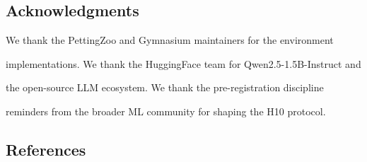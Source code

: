 \documentclass[11pt]{article}
\begin{document}
\subsection{Acknowledgments}\label{acknowledgments}

We thank the PettingZoo and Gymnasium maintainers for the environment

implementations. We thank the HuggingFace team for Qwen2.5-1.5B-Instruct
and

the open-source LLM ecosystem. We thank the pre-registration discipline

reminders from the broader ML community for shaping the H10 protocol.

\subsection{References}\label{references}
\end{document}
